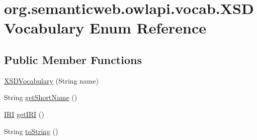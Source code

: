 \hypertarget{enumorg_1_1semanticweb_1_1owlapi_1_1vocab_1_1_x_s_d_vocabulary}{\section{org.\-semanticweb.\-owlapi.\-vocab.\-X\-S\-D\-Vocabulary Enum Reference}
\label{enumorg_1_1semanticweb_1_1owlapi_1_1vocab_1_1_x_s_d_vocabulary}
}
\subsection*{Public Member Functions}
\begin{DoxyCompactItemize}
\item 
\hyperlink{enumorg_1_1semanticweb_1_1owlapi_1_1vocab_1_1_x_s_d_vocabulary_a42c8dbb0374ca0f33db214f9b17055dd}{X\-S\-D\-Vocabulary} (String name)
\item 
String \hyperlink{enumorg_1_1semanticweb_1_1owlapi_1_1vocab_1_1_x_s_d_vocabulary_a35cfede26e213c2182b432d90c6d7fd7}{get\-Short\-Name} ()
\item 
\hyperlink{classorg_1_1semanticweb_1_1owlapi_1_1model_1_1_i_r_i}{I\-R\-I} \hyperlink{enumorg_1_1semanticweb_1_1owlapi_1_1vocab_1_1_x_s_d_vocabulary_aec81370bf0e0d4492775cab209324299}{get\-I\-R\-I} ()
\item 
String \hyperlink{enumorg_1_1semanticweb_1_1owlapi_1_1vocab_1_1_x_s_d_vocabulary_abd77c44675da7c4765a905a77b3675cd}{to\-String} ()
\end{DoxyCompactItemize}
